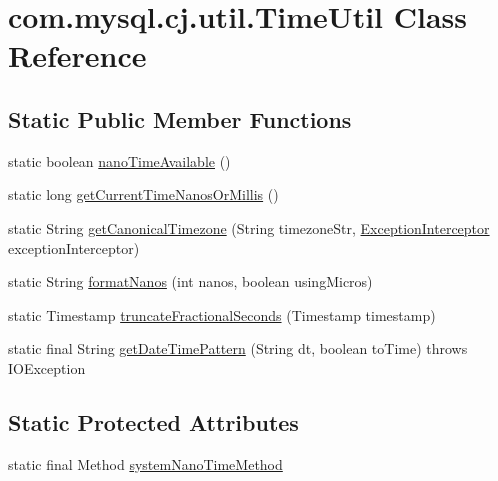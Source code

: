 \hypertarget{classcom_1_1mysql_1_1cj_1_1util_1_1_time_util}{}\section{com.\+mysql.\+cj.\+util.\+Time\+Util Class Reference}
\label{classcom_1_1mysql_1_1cj_1_1util_1_1_time_util}
\subsection*{Static Public Member Functions}
\begin{DoxyCompactItemize}
\item 
static boolean \mbox{\hyperlink{classcom_1_1mysql_1_1cj_1_1util_1_1_time_util_a51171936513c71403df7272e2919783f}{nano\+Time\+Available}} ()
\item 
static long \mbox{\hyperlink{classcom_1_1mysql_1_1cj_1_1util_1_1_time_util_a224da639d5b047ba110cc88396c793f4}{get\+Current\+Time\+Nanos\+Or\+Millis}} ()
\item 
static String \mbox{\hyperlink{classcom_1_1mysql_1_1cj_1_1util_1_1_time_util_a1b38bb130406d82a66ace616a2966b74}{get\+Canonical\+Timezone}} (String timezone\+Str, \mbox{\hyperlink{interfacecom_1_1mysql_1_1cj_1_1exceptions_1_1_exception_interceptor}{Exception\+Interceptor}} exception\+Interceptor)
\item 
static String \mbox{\hyperlink{classcom_1_1mysql_1_1cj_1_1util_1_1_time_util_a1dec8e63da6144ebf8d74f535566c4be}{format\+Nanos}} (int nanos, boolean using\+Micros)
\item 
static Timestamp \mbox{\hyperlink{classcom_1_1mysql_1_1cj_1_1util_1_1_time_util_a49515b1a7c233172bd5fae6f0326c9be}{truncate\+Fractional\+Seconds}} (Timestamp timestamp)
\item 
static final String \mbox{\hyperlink{classcom_1_1mysql_1_1cj_1_1util_1_1_time_util_a1da7f3d2dfbeaf21b375380c2d90b36a}{get\+Date\+Time\+Pattern}} (String dt, boolean to\+Time)  throws I\+O\+Exception 
\end{DoxyCompactItemize}
\subsection*{Static Protected Attributes}
\begin{DoxyCompactItemize}
\item 
static final Method \mbox{\hyperlink{classcom_1_1mysql_1_1cj_1_1util_1_1_time_util_ae26197a4c1007ca664e0be1cc14ca3e2}{system\+Nano\+Time\+Method}}
\end{DoxyCompactItemize}


